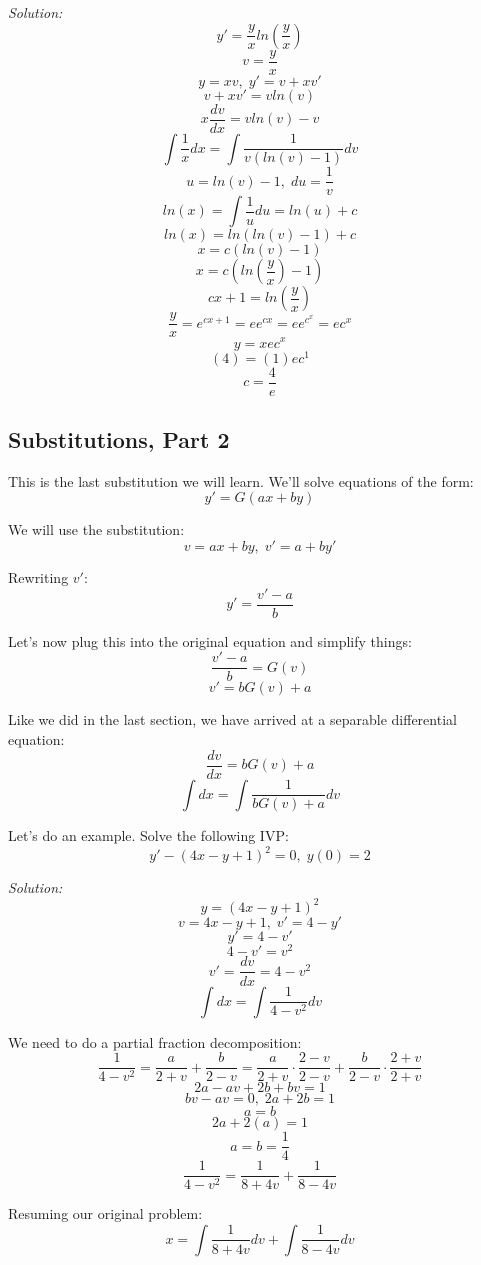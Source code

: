 	\textit{Solution:}
	$$y' = \frac{y}{x}ln\left(\frac{y}{x}\right)$$
	$$v = \frac{y}{x}$$
	$$y = xv,\;y' = v + xv'$$
	$$v + xv' = vln(v)$$
	$$x\frac{dv}{dx} = vln(v) - v$$
	$$\int \frac{1}{x}dx = \int \frac{1}{v(ln(v) - 1)}dv$$
	$$u = ln(v) - 1,\;du = \frac{1}{v}$$
	$$ln(x) = \int \frac{1}{u}du = ln(u) + c$$
	$$ln(x) = ln(ln(v) - 1) + c$$
	$$x = c(ln(v) - 1)$$
	$$x = c\left(ln\left(\frac{y}{x}\right) - 1\right)$$
	$$cx + 1 = ln\left(\frac{y}{x}\right)$$
	$$\frac{y}{x} = e^{cx + 1} = ee^{cx} = ee^{c^{x}} = ec^{x}$$
	$$y = xec^{x}$$
	$$(4) = (1)ec^{1}$$
	$$c = \frac{4}{e}$$
	\begin{center}
	\end{center}
	
	\subsection{Substitutions, Part 2}
	This is the last substitution we will learn. We'll solve equations of the form:
	$$y' = G(ax + by)$$
	
	We will use the substitution:
	$$v = ax + by,\;v' = a + by'$$
	
	Rewriting $v'$:
	$$y' = \frac{v' - a}{b}$$
	
	Let's now plug this into the original equation and simplify things:
	$$\frac{v' - a}{b} = G(v)$$
	$$v' = bG(v) + a$$
	
	Like we did in the last section, we have arrived at a separable differential equation:
	$$\frac{dv}{dx} = bG(v) + a$$
	$$\int dx = \int \frac{1}{bG(v) + a}dv$$
	
	Let's do an example. Solve the following IVP:
	$$y' - (4x - y + 1)^{2} = 0,\;y(0) = 2$$
	
	\textit{Solution:}
	$$y = (4x - y + 1)^{2}$$
	$$v = 4x - y + 1,\;v' = 4 - y'$$
	$$y' = 4 - v'$$
	$$4 - v' = v^{2}$$
	$$v' = \frac{dv}{dx} = 4 - v^{2}$$
	$$\int dx = \int \frac{1}{4 - v^{2}}dv$$
	
	We need to do a partial fraction decomposition:
	$$\frac{1}{4 - v^{2}} = \frac{a}{2 + v} + \frac{b}{2 - v} = \frac{a}{2 + v}\cdot\frac{2 - v}{2 - v} + \frac{b}{2 - v}\cdot\frac{2 + v}{2 + v}$$
	$$2a - av + 2b + bv = 1$$
	$$bv - av = 0,\;2a + 2b = 1$$
	$$a = b$$
	$$2a + 2(a) = 1$$
	$$a = b = \frac{1}{4}$$
	$$\frac{1}{4 - v^{2}} = \frac{1}{8 + 4v} + \frac{1}{8 - 4v}$$
	
	Resuming our original problem:
	$$x = \int \frac{1}{8 + 4v}dv + \int \frac{1}{8 - 4v}dv$$
